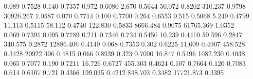 0.089     0.7528 %
0.140     0.7357 %
0.972     0.6080 %
2.670     0.5644 %
50.072    0.8202 %
310.237   0.9798 %
30926.267 1.0587 %
0.070     0.7714 %
0.100     0.7700 %
0.264     0.6553 %
0.515     0.5068 %
5.249     0.4799 %
11.113    0.5115 %
58.112    0.4740 %
122.830   0.5833 %
8666.484  0.9075 %
61765.369 1.0352 %
0.069     0.7391 %
0.095     0.7789 %
0.211     0.7346 %
0.734     0.5450 %
10.239    0.4410 %
59.596    0.2847 %
340.575   0.2872 %
12886.406 0.4149 %
0.068     0.7353 %
0.302     0.6225 %
11.609    0.4907 %
458.528   0.3428 %
20922.406 0.4815 %
0.066     0.8939 %
0.323     0.7090 %
16.847    0.5196 %
1082.230  0.4038 %
0.065     0.7077 %
0.190     0.7211 %
16.726    0.6727 %
455.303   0.4624 %
0.107     0.7664 %
0.120     0.7083 %
0.614     0.6107 %
9.721     0.4366 %
199.035   0.4212 %
848.703   0.3482 %
17721.873 0.3395 %
